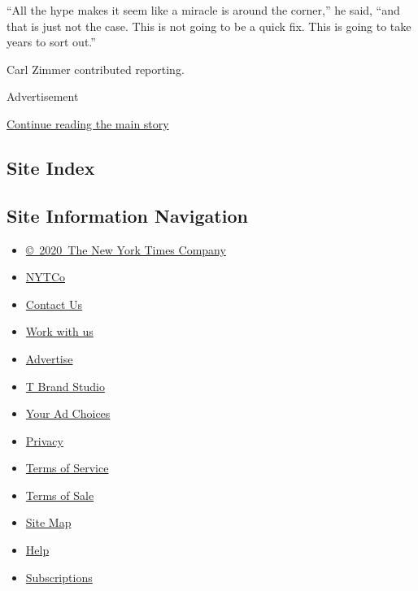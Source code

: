 ``All the hype makes it seem like a miracle is around the corner,'' he
said, ``and that is just not the case. This is not going to be a quick
fix. This is going to take years to sort out.''

Carl Zimmer contributed reporting.

Advertisement

\protect\hyperlink{after-bottom}{Continue reading the main story}

\hypertarget{site-index}{%
\subsection{Site Index}\label{site-index}}

\hypertarget{site-information-navigation}{%
\subsection{Site Information
Navigation}\label{site-information-navigation}}

\begin{itemize}
\tightlist
\item
  \href{https://help.nytimes3xbfgragh.onion/hc/en-us/articles/115014792127-Copyright-notice}{©~2020~The
  New York Times Company}
\end{itemize}

\begin{itemize}
\tightlist
\item
  \href{https://www.nytco.com/}{NYTCo}
\item
  \href{https://help.nytimes3xbfgragh.onion/hc/en-us/articles/115015385887-Contact-Us}{Contact
  Us}
\item
  \href{https://www.nytco.com/careers/}{Work with us}
\item
  \href{https://nytmediakit.com/}{Advertise}
\item
  \href{http://www.tbrandstudio.com/}{T Brand Studio}
\item
  \href{https://www.nytimes3xbfgragh.onion/privacy/cookie-policy\#how-do-i-manage-trackers}{Your
  Ad Choices}
\item
  \href{https://www.nytimes3xbfgragh.onion/privacy}{Privacy}
\item
  \href{https://help.nytimes3xbfgragh.onion/hc/en-us/articles/115014893428-Terms-of-service}{Terms
  of Service}
\item
  \href{https://help.nytimes3xbfgragh.onion/hc/en-us/articles/115014893968-Terms-of-sale}{Terms
  of Sale}
\item
  \href{https://spiderbites.nytimes3xbfgragh.onion}{Site Map}
\item
  \href{https://help.nytimes3xbfgragh.onion/hc/en-us}{Help}
\item
  \href{https://www.nytimes3xbfgragh.onion/subscription?campaignId=37WXW}{Subscriptions}
\end{itemize}
